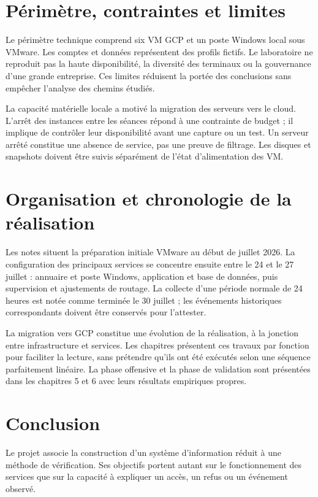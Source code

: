 \documentclass[a4paper,12pt]{report}
\begin{document}
\section{Périmètre, contraintes et limites}
Le périmètre technique comprend six VM GCP et un poste Windows local sous VMware. Les comptes et données représentent des profils fictifs. Le laboratoire ne reproduit pas la haute disponibilité, la diversité des terminaux ou la gouvernance d'une grande entreprise. Ces limites réduisent la portée des conclusions sans empêcher l'analyse des chemins étudiés.

La capacité matérielle locale a motivé la migration des serveurs vers le cloud. L'arrêt des instances entre les séances répond à une contrainte de budget ; il implique de contrôler leur disponibilité avant une capture ou un test. Un serveur arrêté constitue une absence de service, pas une preuve de filtrage. Les disques et snapshots doivent être suivis séparément de l'état d'alimentation des VM.

\section{Organisation et chronologie de la réalisation}
Les notes situent la préparation initiale VMware au début de juillet 2026. La configuration des principaux services se concentre ensuite entre le 24 et le 27 juillet : annuaire et poste Windows, application et base de données, puis supervision et ajustements de routage. La collecte d'une période normale de 24 heures est notée comme terminée le 30 juillet ; les événements historiques correspondants doivent être conservés pour l'attester.

La migration vers GCP constitue une évolution de la réalisation, à la jonction entre infrastructure et services. Les chapitres présentent ces travaux par fonction pour faciliter la lecture, sans prétendre qu'ils ont été exécutés selon une séquence parfaitement linéaire. La phase offensive et la phase de validation sont présentées dans les chapitres 5 et 6 avec leurs résultats empiriques propres.

\section*{Conclusion}
Le projet associe la construction d'un système d'information réduit à une méthode de vérification. Ses objectifs portent autant sur le fonctionnement des services que sur la capacité à expliquer un accès, un refus ou un événement observé.
\end{document}

